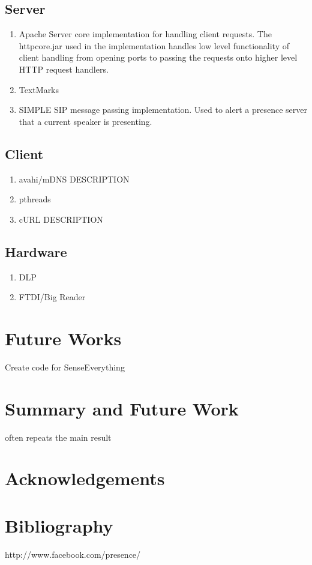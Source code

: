 \documentclass{article}
\begin{document}
	\subsection{Server}
	
		\begin{enumerate}
		\item	Apache
		Server core implementation for handling client requests. The httpcore.jar used in the implementation
		 handles low level functionality of client handling from opening ports to passing the requests onto higher level HTTP request handlers.
			
		\item	TextMarks
		
		\item SIMPLE
		SIP message passing implementation. Used to alert a presence server that a current speaker is presenting.
		
		
		
		\end{enumerate}

		

	\subsection{Client}
	
		\begin{enumerate}
		\item avahi/mDNS
		DESCRIPTION
		\item pthreads

		\item cURL
		DESCRIPTION
		\end{enumerate}


	\subsection{Hardware}
		\begin{enumerate}
		\item DLP

		\item FTDI/Big Reader

		\end{enumerate}
		
		

\section{Future Works}
	Create code for SenseEverything 

	
	\section{Summary and Future Work}
	often repeats the main result 
	\section{Acknowledgements}
	\section{Bibliography} 
	http://www.facebook.com/presence/
\end{document}
